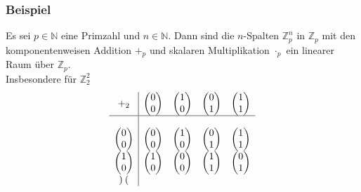 \subsubsection{Beispiel}
Es sei $p\in\mathbb{N}$ eine Primzahl und $n\in\mathbb{N}$.  Dann sind die $n$-Spalten $\mathbb{Z}_p^n$ in $\mathbb{Z}_p$ mit den komponentenweisen Addition $+_p$ und skalaren Multiplikation $\cdot_p$ ein linearer Raum über $\mathbb{Z}_p$.\\
Insbesondere für $\mathbb{Z}_2^2$
\[\begin{array}{c|cccc}+_2 & \begin{pmatrix}0\\ 0\end{pmatrix} & \begin{pmatrix} 1 \\ 0 \end{pmatrix} & \begin{pmatrix}0 \\ 1\end{pmatrix} & \begin{pmatrix}1\\ 1\end{pmatrix} \\ \hline \\ \begin{pmatrix}
0\\ 0\end{pmatrix} &\begin{pmatrix}0 \\ 0\end{pmatrix} &\begin{pmatrix}1\\ 0\end{pmatrix} &\begin{pmatrix}0\\ 1\end{pmatrix} & \begin{pmatrix}1\\ 1\end{pmatrix} \\ \begin{pmatrix}
1\\ 0\end{pmatrix} &\begin{pmatrix}1 \\ 0\end{pmatrix} &\begin{pmatrix}0\\ 0\end{pmatrix} &\begin{pmatrix}1\\ 1\end{pmatrix} & \begin{pmatrix}0\\ 1\end{pmatrix} \\ \begin{pmatrix}

\end{pmatrix}
\end{array}\]
